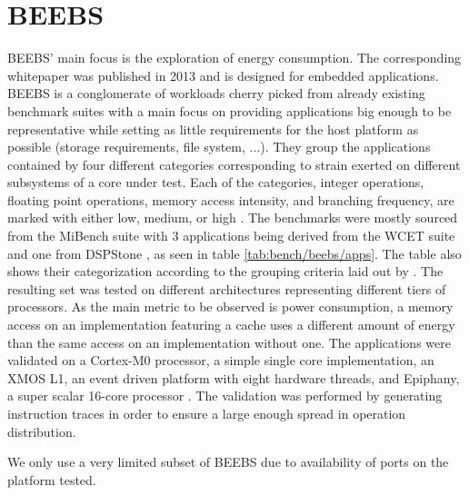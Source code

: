 \documentclass[../bachelor_paper.tex]{subfiles}
\begin{document}
\section{BEEBS}
    \label{sec:bench:beebs}
BEEBS' main focus is the exploration of energy consumption. The corresponding whitepaper was published in 2013 and is designed for embedded applications. BEEBS is a conglomerate of workloads cherry picked from already existing benchmark suites with a main focus on providing applications big enough to be representative while setting as little requirements for the host platform as possible (storage requirements, file system, ...). They group the applications contained by four different categories corresponding to strain exerted on different subsystems of a core under test. Each of the categories, integer operations, floating point operations, memory access intensity, and branching frequency, are marked with either low, medium, or high \cite{pallisterBEEBSOpenBenchmarks2013}. The benchmarks were mostly sourced from the MiBench suite \cite{guthausMiBenchFreeCommercially2001} with 3 applications being derived from the WCET suite \cite{gustafssonMalardalenWCETBenchmarks2010} and one from DSPStone \cite{zivojnovicDSPstoneDSPorientedBenchmarking1994}, as seen in table \ref{tab:bench/beebs/apps}. The table also shows their categorization according to the grouping criteria laid out by \cite{pallisterBEEBSOpenBenchmarks2013}. The resulting set was tested on different architectures representing different tiers of processors. As the main metric to be observed is power consumption, a memory access on an implementation featuring a cache uses a different amount of energy than the same access on an implementation without one. The applications were validated on a Cortex-M0 processor, a simple single core implementation, an XMOS L1, an event driven platform with eight hardware threads, and Epiphany, a super scalar 16-core processor \cite{pallisterBEEBSOpenBenchmarks2013}. The validation was performed by generating instruction traces in order to ensure a large enough spread in operation distribution.

We only use a very limited subset of BEEBS due to availability of ports on the platform tested.
\end{document}
